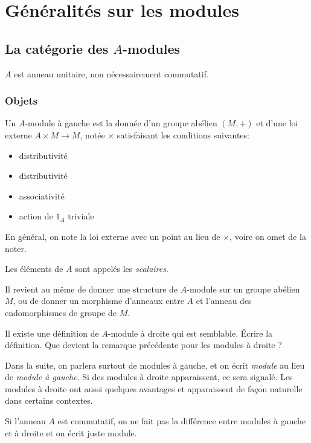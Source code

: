 
\chapter{Généralités sur les modules}

\section{La catégorie des $A$-modules}
$A$ est anneau unitaire, non nécessairement commutatif.
\subsection{Objets}
\begin{definition}
Un $A$-module à gauche est la donnée d'un groupe abélien $(M,+)$ et d'une loi externe $A\times M \to M$, notée $\times$ satisfaisant les conditions suivantes:
\begin{itemize}
\item distributivité
\item distributivité
\item associativité
\item action de $1_A$ triviale
\end{itemize}
\end{definition}

En général, on note la loi externe avec un point au lieu de $\times$, voire on omet de la noter.

Les éléments de $A$ sont appelés les \emph{scalaires}.


\begin{remarque}
Il revient au même de donner une structure de $A$-module sur un  groupe abélien $M$, ou de donner un morphisme d'anneaux entre $A$ et l'anneau des endomorphismes de groupe de $M$.
\end{remarque}

\begin{exo} Il existe une définition de $A$-module à droite qui est semblable. \'Ecrire la définition. Que devient la remarque précédente pour les modules à droite ?
\end{exo}

Dans la suite, on parlera surtout de modules à gauche, et on écrit \emph{module} au lieu de \emph{module à gauche}. Si des modules à droite apparaissent, ce sera signalé. Les modules à droite ont aussi quelques avantages et apparaissent de façon naturelle dans certains contextes.

\begin{remarque} Si l'anneau $A$ est commutatif, on ne fait pas la différence entre modules à gauche et à droite et on écrit juste module.
\end{remarque}

